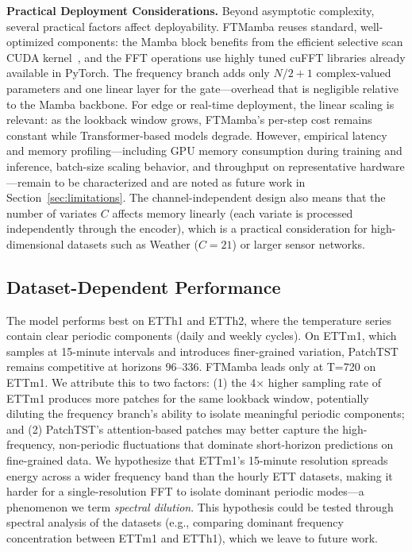 \documentclass[electronics,article,submit,pdftex,moreauthors]{Definitions/mdpi}
\begin{document}
\textbf{Practical Deployment Considerations.} Beyond asymptotic complexity, several practical factors affect deployability. FTMamba reuses standard, well-optimized components: the Mamba block benefits from the efficient selective scan CUDA kernel~\cite{ref10}, and the FFT operations use highly tuned cuFFT libraries already available in PyTorch. The frequency branch adds only $N/2+1$ complex-valued parameters and one linear layer for the gate---overhead that is negligible relative to the Mamba backbone. For edge or real-time deployment, the linear scaling is relevant: as the lookback window grows, FTMamba's per-step cost remains constant while Transformer-based models degrade. However, empirical latency and memory profiling---including GPU memory consumption during training and inference, batch-size scaling behavior, and throughput on representative hardware---remain to be characterized and are noted as future work in Section~\ref{sec:limitations}. The channel-independent design also means that the number of variates $C$ affects memory linearly (each variate is processed independently through the encoder), which is a practical consideration for high-dimensional datasets such as Weather ($C=21$) or larger sensor networks.

\subsection{Dataset-Dependent Performance}

The model performs best on ETTh1 and ETTh2, where the temperature series contain clear periodic components (daily and weekly cycles). On ETTm1, which samples at 15-minute intervals and introduces finer-grained variation, PatchTST remains competitive at horizons 96--336. FTMamba leads only at T=720 on ETTm1. We attribute this to two factors: (1) the 4$\times$ higher sampling rate of ETTm1 produces more patches for the same lookback window, potentially diluting the frequency branch's ability to isolate meaningful periodic components; and (2) PatchTST's attention-based patches may better capture the high-frequency, non-periodic fluctuations that dominate short-horizon predictions on fine-grained data. We hypothesize that ETTm1's 15-minute resolution spreads energy across a wider frequency band than the hourly ETT datasets, making it harder for a single-resolution FFT to isolate dominant periodic modes---a phenomenon we term \textit{spectral dilution}. This hypothesis could be tested through spectral analysis of the datasets (e.g., comparing dominant frequency concentration between ETTm1 and ETTh1), which we leave to future work.
\end{document}
